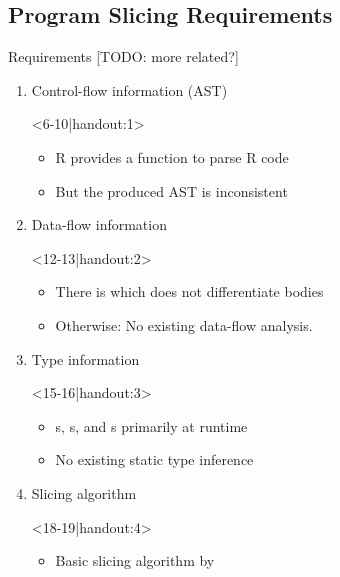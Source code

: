 \def\After#1{\quad\textcolor{gray}{\scriptsize#1}}
\subsection{Program Slicing Requirements}
\begin{frame}[c]{Requirements [TODO: more related?]}%
\vspace*{2mm}\begin{enumerate}
   \itemsep12pt
   \item<2-> Control-flow information (AST) \onslide<11-|handout:2->{\After{partially}}\begin{onlyenv}<6-10|handout:1>
         \begin{itemize}
         \item<6-> R provides a  function to parse R code
         \item<7-> But the produced AST is inconsistent
      \end{itemize}
   \end{onlyenv}
   \item<3-> Data-flow information \onslide<14-|handout:3->{\After{nothing}}\begin{onlyenv}<12-13|handout:2>
      \begin{itemize}
      \item<12-> There is \textsuperscript{\color{gray}\cite{lang_codedepends_2018}} which does not differentiate bodies
      \item<13-> Otherwise: No existing data-flow analysis.
   \end{itemize}
\end{onlyenv}
   \item<4-> Type information \onslide<17-|handout:4->{\After{nothing}}\begin{onlyenv}<15-16|handout:3>
      \begin{itemize}
      \item<15-> s, s, and s primarily at runtime
      \item<16-> No existing static type inference
   \end{itemize}
\end{onlyenv}
   \item<5-> Slicing algorithm \onslide<20-|handout:5->{\After{algorithm}}\begin{onlyenv}<18-19|handout:4>
      \begin{itemize}
      \item<18-> Basic slicing algorithm by \citeauthor{weiser_program_1984}\textsuperscript{\color{gray}\cite{weiser_program_1984}}%

\end{itemize}
\end{onlyenv}
\end{enumerate}
\end{frame}
